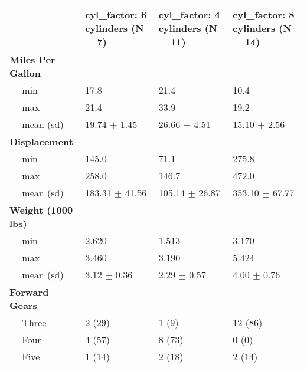 \documentclass[]{article}
\begin{document}
\begin{tabular}{l|l|l|l}
\hline
 & cyl_factor: 6 cylinders (N = 7) & cyl_factor: 4 cylinders (N = 11) & cyl_factor: 8 cylinders (N = 14)\\
\hline
\bf{Miles Per Gallon} & ~ & ~ & ~\\
\hline
~~ min & 17.8 & 21.4 & 10.4\\
\hline
~~ max & 21.4 & 33.9 & 19.2\\
\hline
~~ mean (sd) & 19.74 $\pm$ 1.45 & 26.66 $\pm$ 4.51 & 15.10 $\pm$ 2.56\\
\hline
\bf{Displacement} & ~ & ~ & ~\\
\hline
~~ min & 145.0 & 71.1 & 275.8\\
\hline
~~ max & 258.0 & 146.7 & 472.0\\
\hline
~~ mean (sd) & 183.31 $\pm$ 41.56 & 105.14 $\pm$ 26.87 & 353.10 $\pm$ 67.77\\
\hline
\bf{Weight (1000 lbs)} & ~ & ~ & ~\\
\hline
~~ min & 2.620 & 1.513 & 3.170\\
\hline
~~ max & 3.460 & 3.190 & 5.424\\
\hline
~~ mean (sd) & 3.12 $\pm$ 0.36 & 2.29 $\pm$ 0.57 & 4.00 $\pm$ 0.76\\
\hline
\bf{Forward Gears} & ~ & ~ & ~\\
\hline
~~ Three & 2 (29) & 1 (9) & 12 (86)\\
\hline
~~ Four & 4 (57) & 8 (73) & 0 (0)\\
\hline
~~ Five & 1 (14) & 2 (18) & 2 (14)\\
\hline
\end{tabular}
\end{document}
